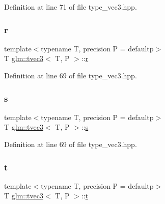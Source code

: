Definition at line 71 of file type\+\_\+vec3.\+hpp.

\mbox{\label{structglm_1_1tvec3_ac558022923dfc3f952f5946532c1f4b0}} 
\subsubsection{\texorpdfstring{r}{r}}
{\footnotesize\ttfamily template$<$typename T, precision P = defaultp$>$ \\
T \mbox{\hyperlink{structglm_1_1tvec3}{glm\+::tvec3}}$<$ T, P $>$\+::\mbox{\hyperlink{glad_8h_abe08814c2f72843fde4d8df41440d5a0}{r}}}



Definition at line 69 of file type\+\_\+vec3.\+hpp.

\mbox{\label{structglm_1_1tvec3_ac350e1f6f735cfd76cd2d44c779ebca2}} 
\subsubsection{\texorpdfstring{s}{s}}
{\footnotesize\ttfamily template$<$typename T, precision P = defaultp$>$ \\
T \mbox{\hyperlink{structglm_1_1tvec3}{glm\+::tvec3}}$<$ T, P $>$\+::\mbox{\hyperlink{glad_8h_af1b1d5edfea6a34daee7389b1b5810ad}{s}}}



Definition at line 69 of file type\+\_\+vec3.\+hpp.

\mbox{\label{structglm_1_1tvec3_a0a83cdfc088a60414654fd56b9b70762}} 
\subsubsection{\texorpdfstring{t}{t}}
{\footnotesize\ttfamily template$<$typename T, precision P = defaultp$>$ \\
T \mbox{\hyperlink{structglm_1_1tvec3}{glm\+::tvec3}}$<$ T, P $>$\+::\mbox{\hyperlink{glad_8h_aef9f00bf06d58b8db7e501e287488401}{t}}}



